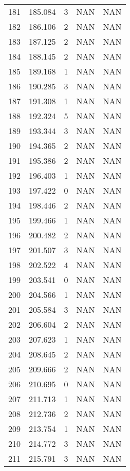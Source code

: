 \documentclass{article}
\begin{document}
\begin{longtable}{@{}lllll@{}}
					181 & 185.084 & 3     & NAN   & NAN   \\
					182 & 186.106 & 2     & NAN   & NAN   \\
					183 & 187.125 & 2     & NAN   & NAN   \\
					184 & 188.145 & 2     & NAN   & NAN   \\
					185 & 189.168 & 1     & NAN   & NAN   \\
					186 & 190.285 & 3     & NAN   & NAN   \\
					187 & 191.308 & 1     & NAN   & NAN   \\
					188 & 192.324 & 5     & NAN   & NAN   \\
					189 & 193.344 & 3     & NAN   & NAN   \\
					190 & 194.365 & 2     & NAN   & NAN   \\
					191 & 195.386 & 2     & NAN   & NAN   \\
					192 & 196.403 & 1     & NAN   & NAN   \\
					193 & 197.422 & 0     & NAN   & NAN   \\
					194 & 198.446 & 2     & NAN   & NAN   \\
					195 & 199.466 & 1     & NAN   & NAN   \\
					196 & 200.482 & 2     & NAN   & NAN   \\
					197 & 201.507 & 3     & NAN   & NAN   \\
					198 & 202.522 & 4     & NAN   & NAN   \\
					199 & 203.541 & 0     & NAN   & NAN   \\
					200 & 204.566 & 1     & NAN   & NAN   \\
					201 & 205.584 & 3     & NAN   & NAN   \\
					202 & 206.604 & 2     & NAN   & NAN   \\
					203 & 207.623 & 1     & NAN   & NAN   \\
					204 & 208.645 & 2     & NAN   & NAN   \\
					205 & 209.666 & 2     & NAN   & NAN   \\
					206 & 210.695 & 0     & NAN   & NAN   \\
					207 & 211.713 & 1     & NAN   & NAN   \\
					208 & 212.736 & 2     & NAN   & NAN   \\
					209 & 213.754 & 1     & NAN   & NAN   \\
					210 & 214.772 & 3     & NAN   & NAN   \\
					211 & 215.791 & 3     & NAN   & NAN   \\

\end{longtable}
\end{document}
